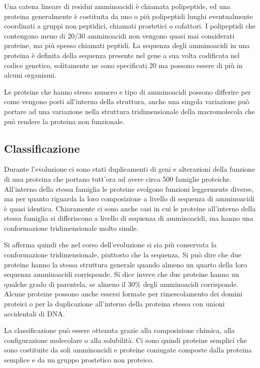 Una catena lineare di residui amminoacidi è chiamata polipeptide, ed una proteina generalmente è costituita da uno o più polipeptidi lunghi eventualmente coordinati 
a gruppi non peptidici, chiamati prostetici o cofattori. I polipeptidi che contengono meno di 20/30 amminoacidi non vengono quasi mai considerati proteine, ma più 
spesso chiamati peptidi. La sequenza degli amminoacidi in una proteina è definita della sequenza presente nel gene a sua volta codificata nel codice genetico, 
solitamente ne sono specificati 20 ma possono essere di più in alcuni organismi.

Le proteine che hanno stesso numero e tipo di amminoacidi possono differire per come vengono posti all'interno della struttura, anche una singola variazione può 
portare ad una variazione nella struttura tridimensionale della macromolecola che può rendere la proteina non funzionale. 

\subsection{Classificazione}\label{subsec:es_subsec}

Durante l'evoluzione ci sono stati duplicamenti di geni e alterazioni della funzione di una proteina che portano tutt'ora ad avere circa 500 famiglie proteiche. 
All'interno della stessa famiglia le proteine svolgono funzioni leggermente diverse, ma per quanto riguarda la loro composizione a livello di sequenza di amminoacidi
è quasi identica. Chiaramente ci sono anche casi in cui le proteine all'interno della stessa famiglia si differiscono a livello di sequenza di amminoacidi, ma hanno 
una conformazione tridimensionale molto simile. 

Si afferma quindi che nel corso dell'evoluzione si sia più conservata la conformazione tridimensionale, piuttosto che la sequenza. Si può dire che due proteine hanno 
la stessa struttura generale quando almeno un quarto della loro sequenza amminoacidi corrisponde. Si dice invece che due proteine hanno un qualche grado di parentela, 
se almeno il 30\% degli amminoacidi corrisponde. Alcune proteine possono anche essersi formate per rimescolamento dei domini proteici o per la duplicazione 
all'interno della proteina stessa con unioni accidentali di DNA. 

La classificazione può essere ottenuta grazie alla composizione chimica, alla configurazione molecolare o alla solubilità. Ci sono quindi proteine semplici che 
sono costituite da soli amminoacidi e proteine coniugate composte dalla proteina semplice e da un gruppo prostetico non proteico.

